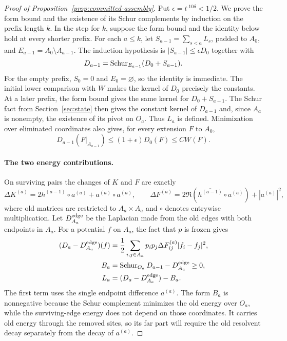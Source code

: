 \begin{proof}[Proof of Proposition~\ref{prop:committed-assembly}]
Put $\epsilon=t^{.10\delta}<1/2$. We prove the form bound and the
existence of its Schur complements by induction on the prefix length $k$.
In the step for $k$, suppose the form bound and the identity below hold
at every shorter prefix. For each $a\le k$, let
$S_{a-1}=\sum_{s<a}L_s$, padded to $A_0$, and
$E_{a-1}=A_0\setminus A_{a-1}$. The induction hypothesis is
$|S_{a-1}|\le\epsilon D_0$ together with
\begin{equation}
 D_{a-1}=\operatorname{Schur}_{E_{a-1}}(D_0+S_{a-1}).
 \label{eq:assembly-schur-identity}
\end{equation}
For the empty prefix, $S_0=0$ and $E_0=\varnothing$, so the identity is immediate.
The initial lower comparison with $W$ makes the kernel of $D_0$
precisely the constants. At a later prefix, the form bound gives the same
kernel for $D_0+S_{a-1}$. The Schur fact from Section~\ref{sec:state}
then gives the constant kernel of $D_{a-1}$ and, since $A_a$ is nonempty,
the existence of its pivot on $O_a$. Thus $L_a$ is defined. Minimization
over eliminated coordinates also gives, for every extension $F$ to $A_0$,
\begin{equation}
 D_{a-1}(F|_{A_{a-1}})
 \le(1+\epsilon)D_0(F)\le CW(F).
 \label{eq:assembly-pre-comparison}
\end{equation}

\paragraph{The two energy contributions.}
On surviving pairs the changes of $K$ and $F$ are exactly
\[
 \Delta K^{(a)}=2h^{(a-1)}\circ a^{(a)}+a^{(a)}\circ a^{(a)},
 \qquad
 \Delta F^{(a)}=2\Re(\overline{h^{(a-1)}}\circ a^{(a)})
                    +|a^{(a)}|^2,
\]
where old matrices are restricted to $A_a\times A_a$ and $\circ$ denotes
entrywise multiplication. Let $D^{\rm edge}_{A_a}$ be the Laplacian made
from the old edges with both endpoints in $A_a$. For a potential $f$ on
$A_a$, the fact that $p$ is frozen gives
\begin{equation}\label{eq:assembly-energy-split}
\begin{aligned}
 (D_a-D^{\rm edge}_{A_a})(f)
 &=\frac12\sum_{i,j\in A_a}p_ip_j\Delta F^{(a)}_{ij}|f_i-f_j|^2,\\
 B_a&=\operatorname{Schur}_{O_a}D_{a-1}-D^{\rm edge}_{A_a}\ge0,\\
 L_a&=(D_a-D^{\rm edge}_{A_a})-B_a.
\end{aligned}
\end{equation}
The first term uses the single endpoint difference $a^{(a)}$. The form
$B_a$ is nonnegative because the Schur complement minimizes the old
energy over $O_a$, while the surviving-edge energy does not depend on
those coordinates. It carries old energy through the removed sites, so
its far part will require the old resolvent decay separately from the
decay of $a^{(a)}$.


\end{proof}
